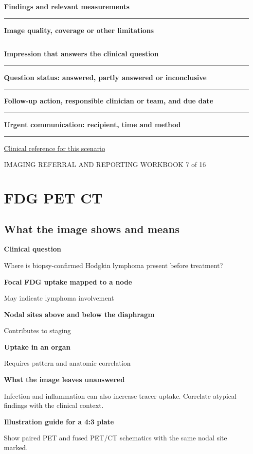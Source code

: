 \documentclass[11pt,a4paper]{article}
\newcommand{\record}[1]{\textbf{#1}\par\vspace{0.55\baselineskip}\hrule\vspace{0.35\baselineskip}}
\begin{document}
\record{Findings and relevant measurements}

\record{Image quality, coverage or other limitations}

\record{Impression that answers the clinical question}

\record{Question status: answered, partly answered or inconclusive}

\record{Follow-up action, responsible clinician or team, and due date}

\record{Urgent communication: recipient, time and method}

\small\href{https://pmc.ncbi.nlm.nih.gov/articles/12165998/}{Clinical reference for this scenario}

\normalsize

\newpage

{\small IMAGING REFERRAL AND REPORTING WORKBOOK \hfill 7 of 16}

\section*{FDG PET CT}

\subsection*{What the image shows and means}

\textbf{Clinical question}\par Where is biopsy-confirmed Hodgkin lymphoma present before treatment?\par

\textbf{Focal FDG uptake mapped to a node}\par May indicate lymphoma involvement\par

\textbf{Nodal sites above and below the diaphragm}\par Contributes to staging\par

\textbf{Uptake in an organ}\par Requires pattern and anatomic correlation\par

\textbf{What the image leaves unanswered}\par Infection and inflammation can also increase tracer uptake. Correlate atypical findings with the clinical context.\par

\textbf{Illustration guide for a 4:3 plate}\par Show paired PET and fused PET/CT schematics with the same nodal site marked.\par
\end{document}
